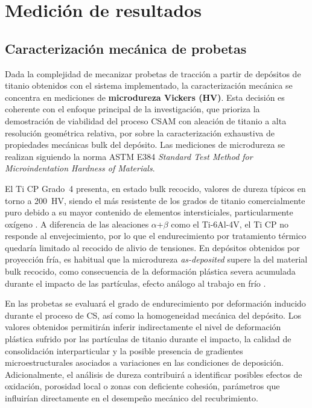\section{Medición de resultados}

\subsection{Caracterización mecánica de probetas}

Dada la complejidad de mecanizar probetas de tracción a partir de depósitos de
titanio obtenidos con el sistema implementado, la caracterización mecánica se
concentra en mediciones de \textbf{microdureza Vickers (HV)}. Esta decisión es coherente
con el enfoque principal de la investigación, que prioriza la demostración de
viabilidad del proceso CSAM con aleación de titanio a alta resolución geométrica
relativa, por sobre la caracterización exhaustiva de propiedades mecánicas bulk
del depósito. Las mediciones de microdureza se realizan siguiendo la norma ASTM E384 \textit{Standard Test Method for Microindentation Hardness of Materials}.

El Ti CP Grado~4 presenta, en estado bulk recocido, valores de dureza 
típicos en torno a \SI{200}{HV}, siendo el más resistente de los grados 
de titanio comercialmente puro debido a su mayor contenido de elementos 
intersticiales, particularmente oxígeno \cite{Leyens2003}. A diferencia 
de las aleaciones $\alpha$+$\beta$ como el Ti-6Al-4V, el Ti CP no 
responde al envejecimiento, por lo que el endurecimiento por tratamiento 
térmico quedaría limitado al recocido de alivio de tensiones. En depósitos 
obtenidos por proyección fría, es habitual que la microdureza 
\textit{as-deposited} supere la del material bulk recocido, como 
consecuencia de la deformación plástica severa acumulada durante el 
impacto de las partículas, efecto análogo al trabajo en frío 
\cite{Huang2020, Yin2022review}. 

En las probetas se evaluará el grado de endurecimiento por deformación inducido durante el proceso de CS, así como la homogeneidad mecánica del depósito. Los valores obtenidos permitirán inferir indirectamente el nivel de deformación plástica sufrido por las partículas de titanio durante el impacto, la calidad de consolidación interparticular y la posible presencia de gradientes microestructurales asociados a variaciones en las condiciones de deposición. Adicionalmente, el análisis de dureza contribuirá a identificar posibles efectos de oxidación, porosidad local o zonas con deficiente cohesión, parámetros que influirían directamente en el desempeño mecánico del recubrimiento.

